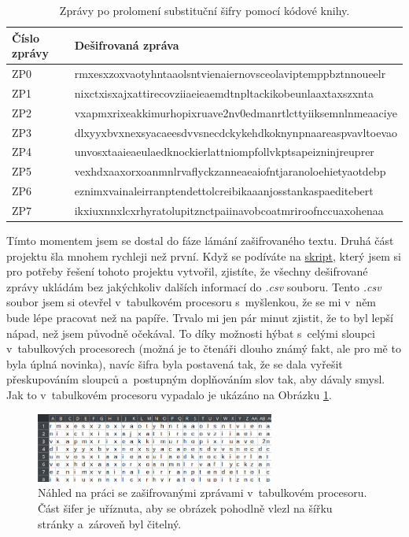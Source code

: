 \documentclass[a4paper, 11pt]{article}
\begin{document}
\begin{table}[h]
    \centering
    \begin{tabular}{l l}
        \toprule 
        \textbf{Číslo zprávy} & \textbf{Dešifrovaná zpráva} \\
        \midrule
        ZP0 & rmxesxzoxvaotyhntaaolsntvienaiernovsceolaviptemppbztnnoueelr \\
        ZP1 & nixctxisxajxattirecovziiaeieaemdtnpltackikobeunlaaxtaxszxnta \\
        ZP2 & vxapmxrixeakkimurhopixruave2nv0edmanrtlcttyiiksemnlnmeaaciye \\
        ZP3 & dlxyyxbvxnexsyacaeesdvvsnecdckykehdkoknynpnaareaspvavltoevao \\
        ZP4 & unvosxtaaieaeulaedknockierlattniompfollvkptsapeizninjreuprer \\
        ZP5 & vexhdxaaxorxoanmnlrvaflyckzanneaeaiofntjaranoloehietyaotdebp \\
        ZP6 & eznimxvainaleirranptendettolcreibikaaanjosstankaspaeditebert \\
        ZP7 & ikxiuxnnxlcxrhyratolupitznctpaiinavobcoatmriroofnccuaxohenaa \\
        \bottomrule 
    \end{tabular}
    \caption{Zprávy po prolomení substituční šifry pomocí kódové knihy.}
    \label{tab:desifrovane_zpravy_codebook}  
\end{table}

Tímto momentem jsem se dostal do fáze lámání zašifrovaného textu.
Druhá část projektu šla mnohem rychleji než první.
Když se podíváte na \hyperref[code:desifrovaci_skript]{skript}, který jsem si pro potřeby řešení tohoto projektu vytvořil, zjistíte, že všechny dešifrované zprávy ukládám bez jakýchkoliv dalších informací do \emph{.csv} souboru.
Tento \emph{.csv} soubor jsem si otevřel v~tabulkovém procesoru s~myšlenkou, že se mi v~něm bude lépe pracovat než na papíře.
Trvalo mi jen pár minut zjistit, že to byl lepší nápad, než jsem původně očekával.
To díky možnosti hýbat s~celými sloupci v~tabulkových procesorech (možná je to čtenáři dlouho známý fakt, ale pro mě to byla úplná novinka), navíc šifra byla postavená tak, že se dala vyřešit přeskupováním sloupců a~postupným doplňováním slov tak, aby dávaly smysl.
Jak to v~tabulkovém procesoru vypadalo je ukázáno na Obrázku \ref{fig:work_in_libreoffice}.

\begin{figure}[ht]
    \centering
    \includegraphics[width=0.7\textwidth]{img/work_in_libreoffice.png}
    \caption{Náhled na práci se zašifrovanými zprávami v~tabulkovém procesoru. Část šifer je uříznuta, aby se obrázek pohodlně vlezl na šířku stránky a~zároveň byl čitelný.}
    \label{fig:work_in_libreoffice}
\end{figure}
\end{document}
